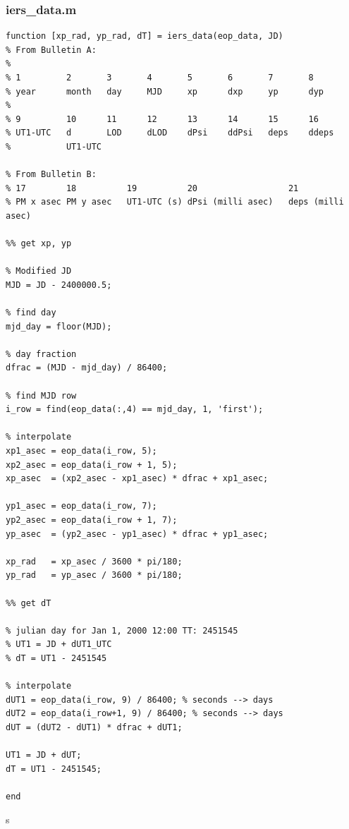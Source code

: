 \documentclass[conf]{new-aiaa}
\begin{document}
\subsubsection{iers\_data.m}
\begin{lstlisting}
function [xp_rad, yp_rad, dT] = iers_data(eop_data, JD) 
% From Bulletin A: 
% 
% 1         2       3       4       5       6       7       8       
% year      month   day     MJD     xp      dxp     yp      dyp 
% 
% 9         10      11      12      13      14      15      16 
% UT1-UTC   d       LOD     dLOD    dPsi    ddPsi   deps    ddeps 
%           UT1-UTC         

% From Bulletin B: 
% 17        18          19          20                  21      
% PM x asec PM y asec   UT1-UTC (s) dPsi (milli asec)   deps (milli asec) 

%% get xp, yp 

% Modified JD 
MJD = JD - 2400000.5; 

% find day 
mjd_day = floor(MJD); 

% day fraction 
dfrac = (MJD - mjd_day) / 86400; 

% find MJD row 
i_row = find(eop_data(:,4) == mjd_day, 1, 'first');  

% interpolate 
xp1_asec = eop_data(i_row, 5); 
xp2_asec = eop_data(i_row + 1, 5); 
xp_asec  = (xp2_asec - xp1_asec) * dfrac + xp1_asec; 

yp1_asec = eop_data(i_row, 7); 
yp2_asec = eop_data(i_row + 1, 7); 
yp_asec  = (yp2_asec - yp1_asec) * dfrac + yp1_asec; 

xp_rad   = xp_asec / 3600 * pi/180; 
yp_rad   = yp_asec / 3600 * pi/180; 

%% get dT 

% julian day for Jan 1, 2000 12:00 TT: 2451545
% UT1 = JD + dUT1_UTC 
% dT = UT1 - 2451545 

% interpolate 
dUT1 = eop_data(i_row, 9) / 86400; % seconds --> days  
dUT2 = eop_data(i_row+1, 9) / 86400; % seconds --> days  
dUT = (dUT2 - dUT1) * dfrac + dUT1; 

UT1 = JD + dUT; 
dT = UT1 - 2451545; 

end 
\end{lstlisting}



s
\end{document}
